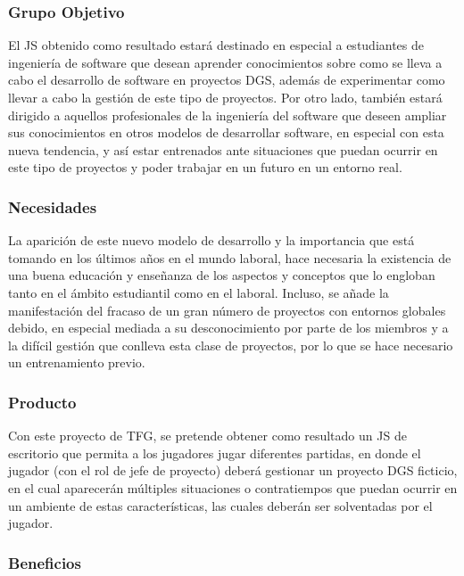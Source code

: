 \subsubsection*{Grupo Objetivo}

El JS obtenido como resultado estará destinado en especial a estudiantes de ingeniería de software que desean aprender conocimientos sobre como se lleva a cabo el desarrollo de software en proyectos DGS, además de experimentar como llevar a cabo la gestión de este tipo de proyectos. Por otro lado, también estará dirigido a aquellos profesionales de la ingeniería del software que deseen ampliar sus conocimientos en otros modelos de desarrollar software, en especial con esta nueva tendencia, y así estar entrenados ante situaciones que puedan ocurrir en este tipo de proyectos y poder trabajar en un futuro en un entorno real.

\subsubsection*{Necesidades}

La aparición de este nuevo modelo de desarrollo y la importancia que está tomando en los últimos años en el mundo laboral, hace necesaria la existencia de una buena educación y enseñanza de los aspectos y conceptos que lo engloban tanto en el ámbito estudiantil como en el laboral. Incluso, se añade la manifestación del fracaso de un gran número de proyectos con entornos globales debido, en especial mediada a su desconocimiento por parte de los miembros y a la difícil gestión que conlleva esta clase de proyectos, por lo que se hace necesario un entrenamiento previo.

\subsubsection*{Producto}

Con este proyecto de TFG, se pretende obtener como resultado un JS de escritorio que permita a los jugadores jugar diferentes partidas, en donde el jugador (con el rol de jefe de proyecto) deberá gestionar un proyecto DGS ficticio, en el cual aparecerán múltiples situaciones o contratiempos que puedan ocurrir en un ambiente de estas características, las cuales deberán ser solventadas por el jugador.

\subsubsection*{Beneficios}


